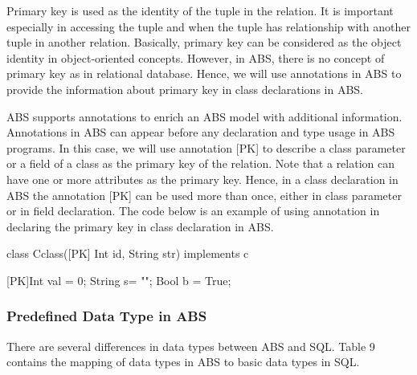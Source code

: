 \documentclass[runningheads,a4paper]{llncs}
\begin{document}
Primary key is used as the identity of the tuple in the relation. It is important especially in accessing the tuple and when the tuple has relationship with another tuple in another relation. Basically, primary key can be considered as the object identity in object-oriented concepts. However, in ABS, there is no concept of primary key as in relational database. Hence, we will use annotations in ABS to provide the information about primary key in class declarations in ABS.

ABS supports annotations to enrich an ABS model with additional information. Annotations in ABS can appear before any declaration and type usage in ABS programs. In this case, we will use annotation [PK] to describe a class parameter or a field of a class as the primary key of the relation. Note that a relation can have one or more attributes as the primary key. Hence, in a class declaration in ABS the annotation [PK] can be used more than once, either in class parameter or in field declaration. The code below is an example of using annotation in declaring the primary key in class declaration in ABS.

\begin{abscode}
	class Cclass([PK] Int id, String str) implements c{
		
		[PK]Int val = 0;
		String s= "";
		Bool b = True;
		
	}
\end{abscode}

\subsubsection{Predefined Data Type in ABS}
There are several differences in data types between ABS and SQL. Table 9 contains the mapping of data types in ABS to basic data types in SQL.
\end{document}
